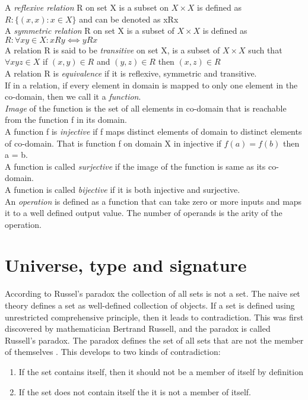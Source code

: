 A \emph{reflexive relation} R on set X is a subset on \(X \times X\)  is defined as \( R : \{(x,x) : x \in X\}\) and can be denoted as xRx \\

A \emph{symmetric relation} R on set X is a subset of \(X \times X\) is defined as \(R: \forall x y \in X: xRy ⟺ yRx\)  \\

A relation R is said to be \emph{transitive} on set X, is a subset of \(X \times X\) such that \(∀ x y z \in X \) if \((x,y) \in R\) and \((y,z) \in R \) then \((x,z) \in R\)\\

A relation R is \emph{equivalence} if it is reflexive, symmetric and transitive. \\

If in a relation, if every element in domain is mapped to only one element in the co-domain, then we call it a \emph{function}.\\

\emph{Image} of the function is the set of all elements in co-domain that is reachable from the function f in its domain.\\

A function f is \emph{injective} if f maps distinct elements of domain to distinct elements of co-domain. That is function f on domain X in injective if \(f(a) = f(b)\) then a = b.\\

A function is called \emph{surjective} if the image of the function is same as its co-domain.\\

A function is called \emph{bijective} if it is both injective and surjective.\\

An \emph{operation} is defined as a function that can take zero or more inputs and maps it to a well defined output value. The number of operands is the arity of the operation.

\section{Universe, type and signature}
According to Russel's paradox \cite{russell2020principles} the collection of all sets is not a set. The naive set theory defines a set as well-defined collection of objects. If a set is defined using unrestricted comprehensive principle\cite{enwiki:1125383109}, then it leads to contradiction. This was first discovered by mathematician Bertrand Russell, and the paradox is called Russell's paradox. The paradox defines the set of all sets that are not the member of themselves  \cite{russelPara}. This develops to two kinds of contradiction:
\begin{enumerate}
\item If the set contains itself, then it should not be a member of itself by definition
\item If the set does not contain itself the it is not a member of itself.
\end{enumerate}

